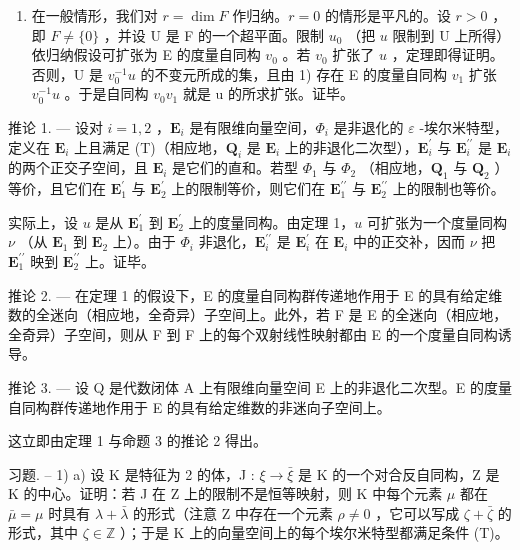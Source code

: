 \begin{enumerate}
\def\labelenumi{\arabic{enumi})}
\setcounter{enumi}{1}
\tightlist
\item
  在一般情形，我们对 \(r = \dim F\) 作归纳。\(r = 0\) 的情形是平凡的。设 \(r > 0\) ，即 \(F \neq \{0\}\) ，并设 U 是 F 的一个超平面。限制 \(u_0\) （把 \(u\) 限制到 U 上所得）依归纳假设可扩张为 E 的度量自同构 \(v_0\) 。若 \(v_0\) 扩张了 \(u\) ，定理即得证明。否则，U 是 \(v_{0}^{-1}u\) 的不变元所成的集，且由 1) 存在 E 的度量自同构 \(v_{1}\) 扩张 \(v_{0}^{-1}u\) 。于是自同构 \(v_{0}v_{1}\) 就是 u 的所求扩张。证毕。
\end{enumerate}

推论 1. --- 设对 \(i=1,2\) ，\(\mathbf{E}_{i}\) 是有限维向量空间，\(\Phi_{i}\) 是非退化的 \(\varepsilon\) -埃尔米特型，定义在 \(\mathbf{E}_{i}\) 上且满足 (T)（相应地，\(\mathbf{Q}_{i}\) 是 \(\mathbf{E}_{i}\) 上的非退化二次型），\(\mathbf{E}_{i}^{\prime}\) 与 \(\mathbf{E}_{i}^{\prime\prime}\) 是 \(\mathbf{E}_{i}\) 的两个正交子空间，且 \(\mathbf{E}_{i}\) 是它们的直和。若型 \(\Phi_{1}\) 与 \(\Phi_{2}\) （相应地，\(\mathbf{Q}_{1}\) 与 \(\mathbf{Q}_{2}\) ）等价，且它们在 \(\mathbf{E}_{1}^{\prime}\) 与 \(\mathbf{E}_{2}^{\prime}\) 上的限制等价，则它们在 \(\mathbf{E}_{1}^{\prime\prime}\) 与 \(\mathbf{E}_{2}^{\prime\prime}\) 上的限制也等价。

实际上，设 \(u\) 是从 \(\mathbf{E}_{1}^{\prime}\) 到 \(\mathbf{E}_{2}^{\prime}\) 上的度量同构。由定理 1，\(u\) 可扩张为一个度量同构 \(\nu\) （从 \(\mathbf{E}_{1}\) 到 \(\mathbf{E}_{2}\) 上）。由于 \(\Phi_{i}\) 非退化，\(\mathbf{E}_{i}^{\prime\prime}\) 是 \(\mathbf{E}_{i}^{\prime}\) 在 \(\mathbf{E}_{i}\) 中的正交补，因而 \(\nu\) 把 \(\mathbf{E}_{1}^{\prime\prime}\) 映到 \(\mathbf{E}_{2}^{\prime\prime}\) 上。证毕。

推论 2. --- 在定理 1 的假设下，E 的度量自同构群传递地作用于 E 的具有给定维数的全迷向（相应地，全奇异）子空间上。此外，若 F 是 E 的全迷向（相应地，全奇异）子空间，则从 F 到 F 上的每个双射线性映射都由 E 的一个度量自同构诱导。

推论 3. --- 设 Q 是代数闭体 A 上有限维向量空间 E 上的非退化二次型。E 的度量自同构群传递地作用于 E 的具有给定维数的非迷向子空间上。

这立即由定理 1 与命题 3 的推论 2 得出。

习题. -- 1) a) 设 K 是特征为 2 的体，J : \(\xi \to \bar{\xi}\) 是 K 的一个对合反自同构，Z 是 K 的中心。证明：若 J 在 Z 上的限制不是恒等映射，则 K 中每个元素 \(\mu\) 都在 \(\bar{\mu} = \mu\) 时具有 \(\lambda + \bar{\lambda}\) 的形式（注意 Z 中存在一个元素 \(\rho \neq 0\) ，它可以写成 \(\zeta + \bar{\zeta}\) 的形式，其中 \(\zeta \in \mathbb{Z}\) ）；于是 K 上的向量空间上的每个埃尔米特型都满足条件 (T)。

